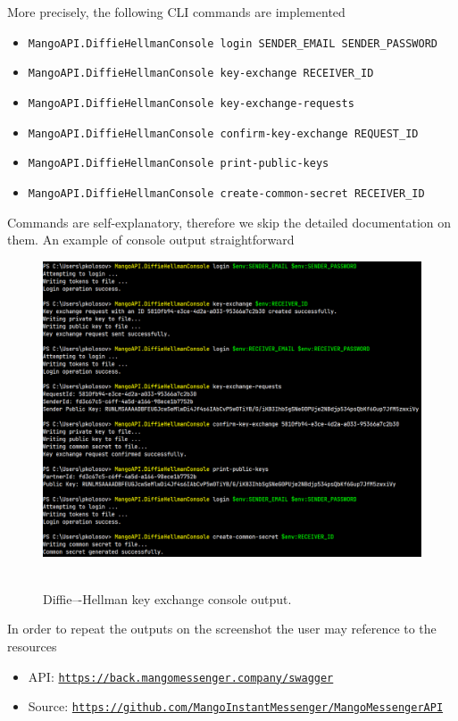 More precisely, the following CLI commands are implemented
\begin{itemize}
    \item \texttt{MangoAPI.DiffieHellmanConsole login SENDER\_EMAIL SENDER\_PASSWORD}
    \item \texttt{MangoAPI.DiffieHellmanConsole key-exchange RECEIVER\_ID}
    \item \texttt{MangoAPI.DiffieHellmanConsole key-exchange-requests}
    \item \texttt{MangoAPI.DiffieHellmanConsole confirm-key-exchange REQUEST\_ID}
    \item \texttt{MangoAPI.DiffieHellmanConsole print-public-keys}
    \item \texttt{MangoAPI.DiffieHellmanConsole create-common-secret RECEIVER\_ID}
\end{itemize}
Commands are self-explanatory, therefore we skip the detailed documentation on them.
An example of console output straightforward
\begin{figure}[H]
    \centering
    \includegraphics[width=1\textwidth]{Pictures/Diffie_Hellman_console_output}
    ~\caption{Diffie–-Hellman key exchange console output.}\label{fig:figure7}
\end{figure}
In order to repeat the outputs on the screenshot the user may reference to the resources
\begin{itemize}
    \item API: \href{https://back.mangomessenger.company/swagger}{\texttt{https://back.mangomessenger.company/swagger}}
    \item Source: \href{https://github.com/MangoInstantMessenger/MangoMessengerAPI}{\texttt{https://github.com/MangoInstantMessenger/MangoMessengerAPI}}
\end{itemize}
